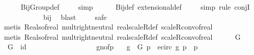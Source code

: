 \begin{isabellebody}
%
\isadelimproof
\ \ \ \ %
\endisadelimproof
%
\isatagproof
{}\isamarkupfalse%
\ BijGroup{\isacharunderscore}def\isanewline
\ \ \ \ \isamarkupfalse%
{\isacharparenleft}simp{\isacharparenright}\isanewline
\ \ \ \ \isamarkupfalse%
\ Bij{\isacharunderscore}def\ extensional{\isacharunderscore}def\isanewline
\ \ \ \ \isamarkupfalse%
{\isacharparenleft}simp{\isacharcomma}\ rule\ conjI{\isacharparenright}\isanewline
\ \ \ \ \isamarkupfalse%
\ {}\isanewline
\ \ \ \ \isamarkupfalse%
\ bij{\isacharunderscore}{\isasymrho}\ \isamarkupfalse%
\ blast\isanewline
\ \ \ \ \isamarkupfalse%
{\isacharparenleft}safe{\isacharparenright}\ \isanewline
\ \ \ \ \ \ \ \isamarkupfalse%
\ {\isacharparenleft}metis\ Reals{\isacharunderscore}of{\isacharunderscore}real\ mult{\isachardot}right{\isacharunderscore}neutral\ real{\isacharunderscore}scaleR{\isacharunderscore}def\ scaleR{\isacharunderscore}conv{\isacharunderscore}of{\isacharunderscore}real{\isacharparenright}\isanewline
\ \ \ \ \isamarkupfalse%
\ {\isacharparenleft}metis\ Reals{\isacharunderscore}of{\isacharunderscore}real\ mult{\isachardot}right{\isacharunderscore}neutral\ real{\isacharunderscore}scaleR{\isacharunderscore}def\ scaleR{\isacharunderscore}conv{\isacharunderscore}of{\isacharunderscore}real{\isacharparenright}\isanewline
\ \ \ \ \isamarkupfalse%
%
\endisatagproof
{\isafoldproof}%
%
\isadelimproof
\isanewline
%
\endisadelimproof
\isanewline
{}\isamarkupfalse%
\ G\ \isanewline
\ \ {\isachardoublequoteopen}G\ {\isasymequiv}\ {\isacharbraceleft}id{\isacharcomma}{\isasymrho}{\isacharcomma}{\isasymrho}\ {\isasymcirc}\ {\isasymrho}{\isacharcomma}{\isasymrho}\ {\isasymcirc}\ {\isasymrho}\ {\isasymcirc}\ {\isasymrho}{\isacharcomma}{\isasymtau}{\isacharcomma}{\isasymtau}\ {\isasymcirc}\ {\isasymrho}{\isacharcomma}{\isasymtau}\ {\isasymcirc}\ {\isasymrho}\ {\isasymcirc}\ {\isasymrho}{\isacharcomma}{\isasymtau}\ {\isasymcirc}\ {\isasymrho}\ {\isasymcirc}\ {\isasymrho}\ {\isasymcirc}\ {\isasymrho}{\isacharbraceright}{\isachardoublequoteclose}\isanewline
\isanewline
{}\isamarkupfalse%
\ g{\isacharunderscore}no{\isacharunderscore}fp{\isacharcolon}\isanewline
\ \ \ {\isachardoublequoteopen}g\ {\isasymin}\ G{\isachardoublequoteclose}\ {\isachardoublequoteopen}p\ {\isasymin}\ e{\isacharunderscore}circ{\isachardoublequoteclose}\ {\isachardoublequoteopen}g\ p\ {\isacharequal}\ p{\isachardoublequoteclose}\ \isanewline

\end{isabellebody}
